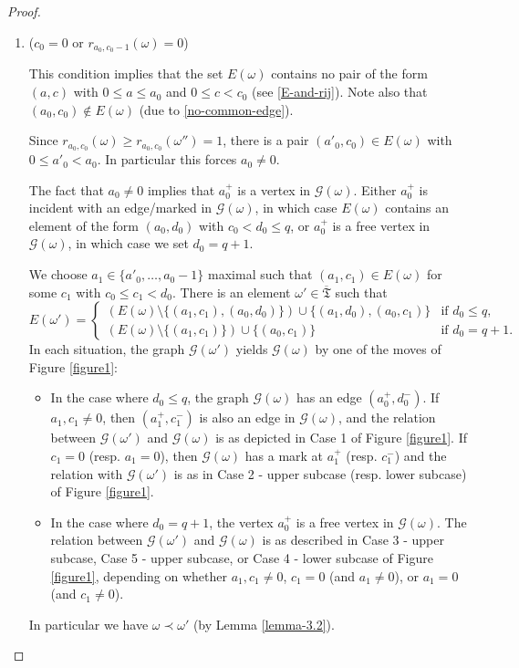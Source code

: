 \documentclass[11pt]{article}
\theoremstyle{definition}
\numberwithin{equation}{section}
\newcommand{\ppermutationsof}{\mathfrak{T}}
\newcommand{\parameters}{\overline{\ppermutationsof}}
\begin{document}
\begin{proof}
\begin{enumerate}[label=\textbf{Case \arabic*}]
\item ($c_0=0$ or $r_{a_0,c_0-1}(\omega)=0$)

\noindent This condition implies that the set $E(\omega)$ contains no pair of the form $(a,c)$ with $0\leq a\leq a_0$ and $0\leq c<c_0$ (see \eqref{E-and-rij}).
Note also that $(a_0,c_0)\notin E(\omega)$ (due to \eqref{no-common-edge}).

Since $r_{a_0,c_0}(\omega)\geq r_{a_0,c_0}(\omega'')=1$, there is a pair $(a'_0,c_0)\in E(\omega)$ with $0\leq a'_0< a_0$.
In particular this forces $a_0\not=0$.

The fact that $a_0\not=0$ implies that $a_0^+$ is a vertex in $\mathcal{G}(\omega)$. Either $a_0^+$ is incident with an edge/marked in $\mathcal{G}(\omega)$, in which case $E(\omega)$ contains an element of the form $(a_0,d_0)$ with $c_0< d_0\leq q$, or $a_0^+$ is a free vertex in $\mathcal{G}(\omega)$, in which case we set $d_0=q+1$.

We choose $a_1\in\{a'_0,\ldots,a_0-1\}$ maximal such that $(a_1,c_1)\in E(\omega)$ for some $c_1$ with $c_0\leq c_1<d_0$.
There is an element
$\omega'\in\parameters$ such that
\[
E(\omega')=\left\{\begin{array}{ll}
(E(\omega)\setminus\{(a_1,c_1),(a_0,d_0)\})\cup\{(a_1,d_0),(a_0,c_1)\} & \mbox{if $d_0\leq q$},\\
(E(\omega)\setminus\{(a_1,c_1)\})\cup\{(a_0,c_1)\} & \mbox{if $d_0=q+1$}.
\end{array}
\right.
\]
In each situation, the graph $\mathcal{G}(\omega')$ yields $\mathcal{G}(\omega)$ by one of the moves of Figure \ref{figure1}:
\begin{itemize}
\item In the case where $d_0\leq q$,
the graph $\mathcal{G}(\omega)$ has an edge $(a_0^+,d_0^-)$. If
$a_1,c_1\not=0$, then $(a_1^+,c_1^-)$ is also an edge in
$\mathcal{G}(\omega)$, and the relation between
$\mathcal{G}(\omega')$ and $\mathcal{G}(\omega)$ is as depicted in
Case 1 of Figure \ref{figure1}. If $c_1=0$ (resp. $a_1=0$), then
$\mathcal{G}(\omega)$ has a mark at $a_1^+$ (resp. $c_1^-$) and the
relation with $\mathcal{G}(\omega')$ is as in Case 2 - upper subcase
(resp. lower subcase) of Figure \ref{figure1}.
\item In the case where $d_0=q+1$, the vertex $a_0^+$ is a free vertex in $\mathcal{G}(\omega)$. The relation between $\mathcal{G}(\omega')$ and $\mathcal{G}(\omega)$ is as described in Case 3 - upper subcase, Case 5 - upper subcase, or Case 4 - lower subcase of Figure \ref{figure1}, depending on whether
$a_1,c_1\not=0$, $c_1=0$ (and $a_1\not=0$), or $a_1=0$ (and $c_1\not=0$).
\end{itemize}
In particular we have $\omega\prec\omega'$ (by Lemma \ref{lemma-3.2}).


\end{enumerate}
\end{proof}
\end{document}
